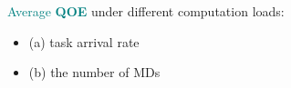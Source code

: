 \begin{frame}
\begin{figure}
	\end{figure}
	
	\textcolor{teal}{Average \textbf{QOE}} under different computation loads:
	\begin{itemize}[]
		
		\item (a) task arrival rate
		
		\item (b) the number of MDs
		
	\end{itemize}
	
\end{frame}



